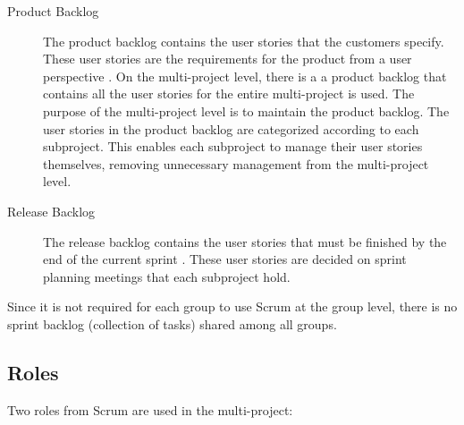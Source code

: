 \begin{description}
  \item[Product Backlog] The product backlog contains the user stories that the customers specify. These user stories are the requirements for the product from a user perspective \parencite{larman2003}. On the multi-project level, there is a a product backlog that contains all the user stories for the entire multi-project is used. The purpose of the multi-project level is to maintain the product backlog. The user stories in the product backlog are categorized according to each subproject. This enables each subproject to manage their user stories themselves, removing unnecessary management from the multi-project level.
  \item[Release Backlog] The release backlog contains the user stories that must be finished by the end of the current sprint \parencite{larman2003}. These user stories are decided on sprint planning meetings that each subproject hold.
\end{description}

Since it is not required for each group to use Scrum at the group level, there is no sprint backlog (collection of tasks) shared among all groups.

\subsection{Roles}
Two roles from Scrum are used in the multi-project:

